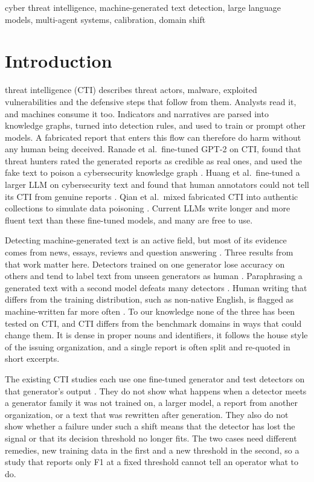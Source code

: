 \documentclass[journal]{IEEEtran}
\begin{document}
\begin{IEEEkeywords}
cyber threat intelligence, machine-generated text detection, large language models, multi-agent systems,
calibration, domain shift
\end{IEEEkeywords}

\section{Introduction}
 threat intelligence (CTI) describes threat actors, malware, exploited vulnerabilities and the
defensive steps that follow from them. Analysts read it, and machines consume it too. Indicators and narratives are
parsed into knowledge graphs, turned into detection rules, and used to train or prompt other models. A fabricated
report that enters this flow can therefore do harm without any human being deceived. Ranade et al.\ fine-tuned GPT-2
on CTI, found that threat hunters rated the generated reports as credible as real ones, and used the fake text to
poison a cybersecurity knowledge graph \cite{Ranade_2021}. Huang et al.\ fine-tuned a larger LLM on cybersecurity
text and found that human annotators could not tell its CTI from genuine reports \cite{Huang_2025}. Qian et al.\
mixed fabricated CTI into authentic collections to simulate data poisoning \cite{Qian_2025}. Current LLMs write
longer and more fluent text than these fine-tuned models, and many are free to use.

Detecting machine-generated text is an active field, but most of its evidence comes from news, essays, reviews and
question answering \cite{Wang_2024,Dugan_2024,Wu_2024}. Three results from that work matter here. Detectors trained
on one generator lose accuracy on others and tend to label text from unseen generators as human
\cite{Wang_2024,Dugan_2024}. Paraphrasing a generated text with a second model defeats many detectors
\cite{Krishna_2023,Sadasivan_2023}. Human writing that differs from the training distribution, such as non-native
English, is flagged as machine-written far more often \cite{Liang_2023}. To our knowledge none of the three has been
tested on CTI, and CTI differs from the benchmark domains in ways that could change them. It is dense in proper nouns and
identifiers, it follows the house style of the issuing organization, and a single report is often split and
re-quoted in short excerpts.

The existing CTI studies each use one fine-tuned generator and test detectors on that generator's output
\cite{Ranade_2021,Huang_2025,Qian_2025}. They do not show what happens when a detector meets a generator family it
was not trained on, a larger model, a report from another organization, or a text that was rewritten after
generation. They also do not show whether a failure under such a shift means that the detector has lost the signal
or that its decision threshold no longer fits. The two cases need different remedies, new training data in the
first and a new threshold in the second, so a study that reports only F1 at a fixed threshold cannot tell an
operator what to do.
\end{document}
